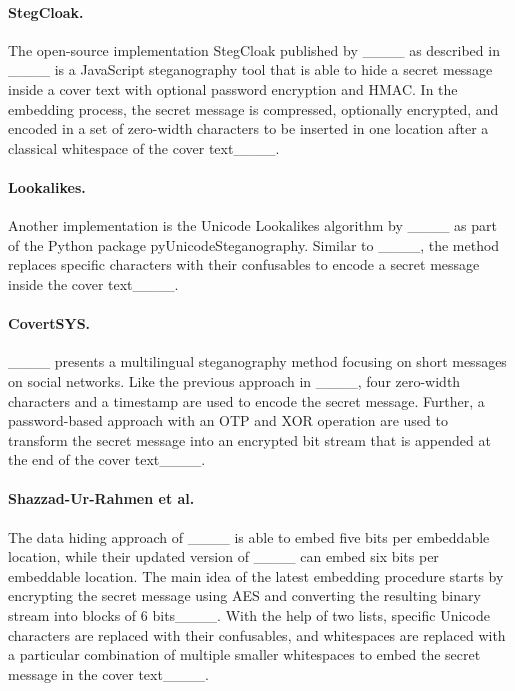 	\paragraph{StegCloak.} The open-source implementation StegCloak published by ____ as described in ____ is a JavaScript steganography tool that is able to hide a secret message inside a cover text with optional password encryption and \ac{HMAC}. In the embedding process, the secret message is compressed, optionally encrypted, and encoded in a set of zero-width characters to be inserted in one location after a classical whitespace of the cover text____.
	
	\paragraph{Lookalikes.} Another implementation is the Unicode Lookalikes algorithm by ____ as part of the Python package pyUnicodeSteganography. Similar to ____, the method replaces specific characters with their confusables to encode a secret message inside the cover text____.
	
	\paragraph{CovertSYS.} ____ presents a multilingual steganography method focusing on short messages on social networks. Like the previous approach in ____, four zero-width characters and a timestamp are used to encode the secret message. Further, a password-based approach with an \ac{OTP} and XOR operation are used to transform the secret message into an encrypted bit stream that is appended at the end of the cover text____.
	
	\paragraph{Shazzad-Ur-Rahmen et al.} The data hiding approach of ____ is able to embed five bits per embeddable location, while their updated version of ____ can embed six bits per embeddable location. The main idea of the latest embedding procedure starts by encrypting the secret message using AES and converting the resulting binary stream into blocks of 6 bits____. With the help of two lists, specific Unicode characters are replaced with their confusables, and whitespaces are replaced with a particular combination of multiple smaller whitespaces to embed the secret message in the cover text____.
	
